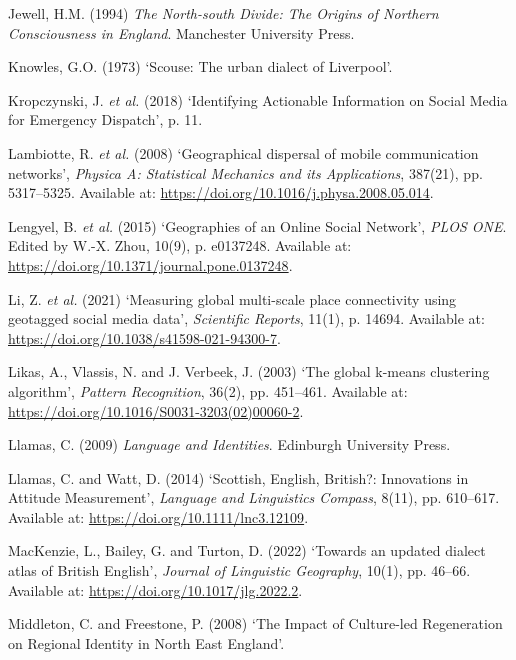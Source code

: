 \documentclass[
]{article}
\newlength{\cslhangindent}
\newenvironment{CSLReferences}[2] %
 {\begin{list}{}{%
  \setlength{\itemindent}{0pt}
  \setlength{\leftmargin}{0pt}
  \setlength{\parsep}{0pt}
  \ifodd #1
   \setlength{\leftmargin}{\cslhangindent}
   \setlength{\itemindent}{-1\cslhangindent}
  \fi
  \setlength{\itemsep}{#2\baselineskip}}}
 {\end{list}}
\begin{document}
\begin{CSLReferences}{0}{1}
Jewell, H.M. (1994) \emph{The {North-south Divide}: {The Origins} of
{Northern Consciousness} in {England}}. {Manchester University Press}.

Knowles, G.O. (1973) {`Scouse: The urban dialect of {Liverpool}'}.

Kropczynski, J. \emph{et al.} (2018) {`Identifying {Actionable
Information} on {Social Media} for {Emergency Dispatch}'}, p. 11.

Lambiotte, R. \emph{et al.} (2008) {`Geographical dispersal of mobile
communication networks'}, \emph{Physica A: Statistical Mechanics and its
Applications}, 387(21), pp. 5317--5325. Available at:
\url{https://doi.org/10.1016/j.physa.2008.05.014}.

Lengyel, B. \emph{et al.} (2015) {`Geographies of an {Online Social
Network}'}, \emph{PLOS ONE}. Edited by W.-X. Zhou, 10(9), p. e0137248.
Available at: \url{https://doi.org/10.1371/journal.pone.0137248}.

Li, Z. \emph{et al.} (2021) {`Measuring global multi-scale place
connectivity using geotagged social media data'}, \emph{Scientific
Reports}, 11(1), p. 14694. Available at:
\url{https://doi.org/10.1038/s41598-021-94300-7}.

Likas, A., Vlassis, N. and J. Verbeek, J. (2003) {`The global k-means
clustering algorithm'}, \emph{Pattern Recognition}, 36(2), pp. 451--461.
Available at: \url{https://doi.org/10.1016/S0031-3203(02)00060-2}.

Llamas, C. (2009) \emph{Language and {Identities}}. {Edinburgh
University Press}.

Llamas, C. and Watt, D. (2014) {`Scottish, {English}, {British}?:
{Innovations} in {Attitude Measurement}'}, \emph{Language and
Linguistics Compass}, 8(11), pp. 610--617. Available at:
\url{https://doi.org/10.1111/lnc3.12109}.

MacKenzie, L., Bailey, G. and Turton, D. (2022) {`Towards an updated
dialect atlas of {British English}'}, \emph{Journal of Linguistic
Geography}, 10(1), pp. 46--66. Available at:
\url{https://doi.org/10.1017/jlg.2022.2}.

Middleton, C. and Freestone, P. (2008) {`The {Impact} of {Culture-led
Regeneration} on {Regional Identity} in {North East England}'}.


\end{CSLReferences}
\end{document}
